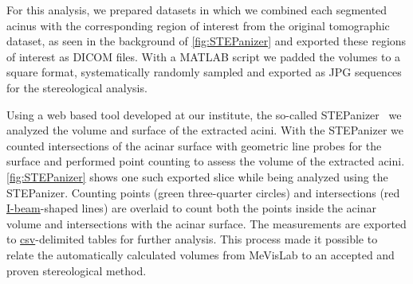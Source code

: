 \documentclass[%
	twoside,
	paper=a4,%
	abstract=true,%
	]{scrartcl}
\begin{document}
For this analysis, we prepared datasets in which we combined each segmented acinus with the corresponding region of interest from the original tomographic dataset, as seen in the background of \autoref{fig:STEPanizer} and exported these regions of interest as DICOM files. With a MATLAB script we padded the volumes to a square format, systematically randomly sampled and exported as JPG sequences for the stereological analysis.

Using a web based tool developed at our institute, the so-called STEPanizer~\cite[available free of charge at \url{http://stepanizer.com}]{Tschanz2011} we analyzed the volume and surface of the extracted acini. With the STEPanizer we counted intersections of the acinar surface with geometric line probes for the surface and performed point counting to assess the volume of the extracted acini. \autoref{fig:STEPanizer} shows one such exported slice while being analyzed using the STEPanizer. Counting points (green three-quarter circles) and intersections (red \href{https://encrypted.google.com/search?q=i-beam&tbm=isch}{I-beam}-shaped lines) are overlaid to count both the points inside the acinar volume and intersections with the acinar surface. The measurements are exported to \href{https://secure.wikimedia.org/wikipedia/en/w/index.php?title=Comma-separated_values&oldid=441921632}{csv}-delimited tables for further analysis. This process made it possible to relate the automatically calculated volumes from MeVisLab to an accepted and proven stereological method.
\end{document}

